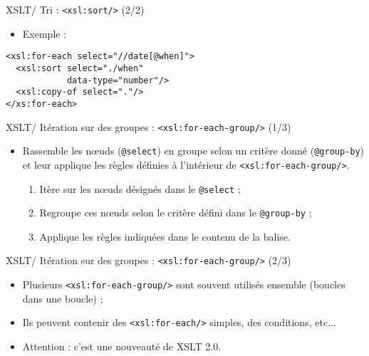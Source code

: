 \documentclass{beamer}
\begin{document}
    \begin{frame}[fragile]{XSLT/ Tri : \texttt{<xsl:sort/>} (2/2)}
        \Large
        \begin{itemize}
            \item Exemple :
        \end{itemize}
        \begin{verbatim}
<xsl:for-each select="//date[@when]">
  <xsl:sort select="./when" 
            data-type="number"/>
  <xsl:copy-of select="."/>
</xs:for-each>
        \end{verbatim}
    \end{frame}

    \begin{frame}{XSLT/ Itération sur des groupes : \texttt{<xsl:for-each-group/>} (1/3)}
        \Large
        \begin{itemize}
            \item Rassemble les n\oe uds (\texttt{@select}) en groupe selon un critère donné (\texttt{@group-by}) et leur applique les règles définies à l'intérieur de \texttt{<xsl:for-each-group/>}.
            \bigskip
            \begin{enumerate}
            \Large
                \item Itère sur les n\oe uds désignés dans le \texttt{@select} ;
                \item Regroupe ces n\oe uds selon le critère défini dans le \texttt{@group-by} ;
                \item Applique les règles indiquées dans le contenu de la balise.
            \end{enumerate}
        \end{itemize}
    \end{frame}

    \begin{frame}{XSLT/ Itération sur des groupes : \texttt{<xsl:for-each-group/>} (2/3)}
        \Large
        \begin{itemize}
            \item Plusieurs \texttt{<xsl:for-each-group/>} sont souvent utilisés ensemble (boucles dans une boucle) ;
            \bigskip
            \item Ils peuvent contenir des \texttt{<xsl:for-each/>} simples, des conditions, etc...
            \bigskip
            \item Attention : c'est une nouveauté de XSLT 2.0.
        \end{itemize}
    \end{frame}
\end{document}

